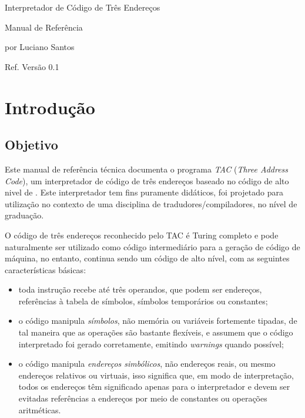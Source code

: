 \documentclass[12pt,a4paper,extrafontsizes,article]{memoir}
\begin{document}
\frontmatter
\pagestyle{empty}

\vspace*{\fill}
\begin{center}
\par
\Large{Interpretador de Código de Três Endereços}\par
\LARGE{Manual de Referência}\par
\vspace*{\fill}
\large{por Luciano Santos}\par
\bigskip
\normalsize{}\par
\medskip
\normalsize{Ref. Versão 0.1}\par
\end{center}


\clearpage

\pagestyle{headings}

\tableofcontents
\clearpage
\listoftables
\clearpage

\mainmatter


\chapter{Introdução}

\section{Objetivo}

Este manual de referência técnica documenta o programa \textit{TAC} (\textit{Three Address Code}), um interpretador de
código de três endereços baseado no código de alto nivel de \citeauthor{Aho:1986:CPT:6448}. Este interpretador tem fins
puramente didáticos, foi projetado para utilização no contexto de uma disciplina de tradudores/compiladores, no nível de
graduação.

O código de três endereços reconhecido pelo TAC é Turing completo e pode naturalmente ser utilizado como código
intermediário para a geração de código de máquina, no entanto, continua sendo um código de alto nível, com as seguintes
características básicas:
\begin{itemize}
  \item toda instrução recebe até três operandos, que podem ser endereços, referências à tabela de símbolos,
  símbolos temporários ou constantes;
  \item o código manipula \textit{símbolos}, não memória ou variáveis fortemente tipadas, de tal maneira que as
  operações são bastante flexíveis, e assumem que o código interpretado foi gerado corretamente, emitindo
  \textit{warnings} quando possível;
  \item o código manipula \textit{endereços simbólicos}, não endereços reais, ou mesmo endereços relativos ou virtuais,
  isso significa que, em modo de interpretação, todos os endereços têm significado apenas para o interpretador e devem
  ser evitadas referências a endereços por meio de constantes ou operações aritméticas.
\end{itemize}
\end{document}
